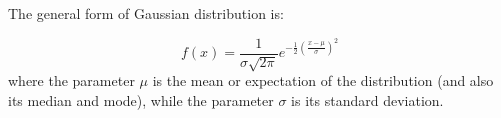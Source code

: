 The general form of Gaussian distribution is:

\begin{equation}
	f(x)=\frac{1}{\sigma \sqrt{2 \pi}} e^{-\frac{1}{2}\left(\frac{x-\mu}{\sigma}\right)^2}
\end{equation}
where the parameter $\mu$ is the mean or expectation of the distribution (and also its median and mode), while the parameter 
$\sigma$ is its standard deviation.

%
%
%
%

